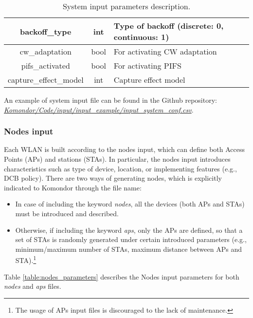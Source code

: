 \documentclass[a4paper]{article}
\begin{document}
\begin{table}[h!]
\begin{scriptsize}
\begin{tabular}{|c|c|l|}
		backoff\_type & int & Type of backoff (discrete: 0, continuous: 1) \\ \hline
		cw\_adaptation & bool & For activating CW adaptation \\ \hline
		pifs\_activated & bool & For activating PIFS \\ \hline
		capture\_effect\_model & int & Capture effect model \\ \hline
	\end{tabular}
	\end{scriptsize}
	\caption{System input parameters description.}
	\label{table:system_parameters}
\end{table}

An example of system input file can be found in the Github repository:  \href{https://github.com/wn-upf/Komondor/blob/master/Code/input/input_example/input_system_conf.csv}{\textit{Komondor/Code/input/input\_example/input\_system\_conf.csv}}.

\subsubsection{Nodes input}
\label{section:nodes_input}	
Each WLAN is built according to the nodes input, which can define both Access Points (APs) and stations (STAs). In particular, the nodes input introduces characteristics such as type of device, location, or implementing features (e.g., DCB policy). There are two ways of generating nodes, which is explicitly indicated to Komondor through the file name:
\begin{itemize}
	\item In case of including the keyword \emph{nodes}, all the devices (both APs and STAs) must be introduced and described.
	\item Otherwise, if including the keyword \emph{aps}, only the APs are defined, so that a set of STAs is randomly generated under certain introduced parameters (e.g., minimum/maximum number of STAs, maximum distance between APs and STA).\footnote{The usage of APs input files is discouraged to the lack of maintenance.}
\end{itemize}

Table \ref{table:nodes_parameters} describes the Nodes input parameters for both \emph{nodes} and \emph{aps} files. 
\end{document}
